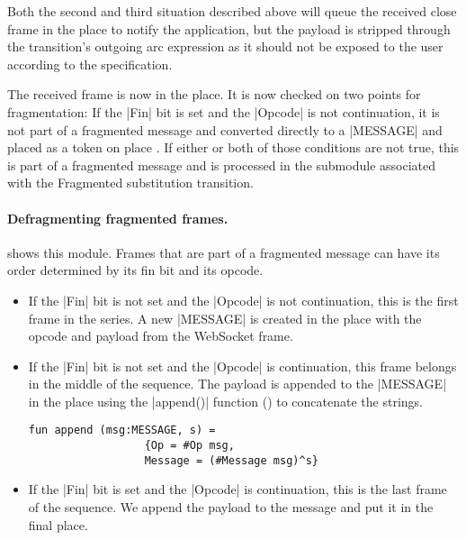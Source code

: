 		Both the second and third situation described above will queue the received
		close frame in the  place to notify the application, but the payload is
		stripped through the  transition's outgoing arc
		expression as it should not be exposed to the user according to the
		specification.
		
		The received frame is now in the  place. It is now checked
		on two points for fragmentation:
		If the |Fin| bit is set and the |Opcode| is not continuation, it is not part of
		a fragmented message and converted directly to a |MESSAGE| and placed as a
		token on place .
		If either or both of those conditions are not true, this is part of a fragmented message and is processed
		in the  submodule associated with the Fragmented
		substitution transition.
		
		\paragraph{Defragmenting fragmented frames.}
			
			 shows this module. Frames that are part of a fragmented
			message can have its order determined by its fin bit and its opcode.
			
			
			\begin{itemize}
				\item If the |Fin| bit is not set and the |Opcode| is not continuation, this is the
				first frame in the series. A new |MESSAGE| is created in the
				 place with the opcode and payload from the WebSocket frame.
				
				\item If the |Fin| bit is not set and the |Opcode| is continuation, this
				frame belongs in the middle of the sequence. The payload is appended to the
				|MESSAGE| in the  place using the |append()|
				function () to concatenate the strings.
				
				\begin{lstlisting}[label=lst:append,caption=append,gobble=3,float=h]
				fun append (msg:MESSAGE, s) = 
				  {Op = #Op msg,
				  Message = (#Message msg)^s}
				\end{lstlisting}
				
				\item If the |Fin| bit is set and the |Opcode| is continuation, this is the
				last frame of the sequence. We append the payload to the message and put it in the final
				 place. 
			\end{itemize}
			
